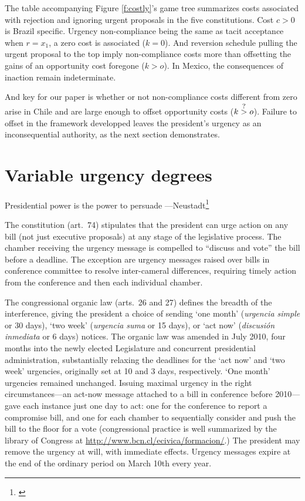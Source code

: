 \documentclass[letter,12pt]{article}
\begin{document}
The table accompanying Figure \ref{f:costly}'s game tree summarizes costs associated with rejection and ignoring urgent proposals in the five constitutions. Cost $c>0$ is Brazil specific. Urgency non-compliance being the same as tacit acceptance when $r=x_1$, a zero cost is associated ($k=0$). And reversion schedule pulling the urgent proposal to the top imply non-compliance costs more than offsetting the gains of an opportunity cost foregone ($k>o$). In Mexico, the consequences of inaction remain indeterminate. 

\newcommand\mygt{\mathrel{\stackrel{\makebox[0pt]{\mbox{\normalfont\footnotesize ?}}}{>}}} %

And key for our paper is whether or not non-compliance costs different from zero arise in Chile and are large enough to offset opportunity costs ($k \mygt o$). Failure to offset in the framework developped leaves the president's urgency as an inconsequential authority, as the next section demonstrates. %

\section{Variable urgency degrees}
\begin{center}
Presidential power is the power to persuade ---Neustadt\footnote{\citet[][11]{neustadt.1990}}
\end{center}

The constitution (art.\ 74) stipulates that the president can urge action on any bill (not just executive proposals) at any stage of the legislative process. The chamber receiving the urgency message is compelled to ``discuss and vote'' the bill before a deadline. The exception are urgency messages raised over bills in conference committee to resolve inter-cameral differences, requiring timely action from the conference and then each individual chamber.

The congressional organic law (arts.\ 26 and 27) defines the breadth of the interference, giving the president a choice of sending `one month' (\emph{urgencia simple} or 30 days), `two week' (\emph{urgencia suma} or 15 days), or `act now' (\emph{discusión inmediata} or 6 days) notices. The organic law was amended in July 2010, four months into the newly elected Legislature and concurrent presidential administration, substantially relaxing the deadlines for the `act now' and `two week' urgencies, originally set at 10 and 3 days, respectively. `One month' urgencies remained unchanged. Issuing maximal urgency in the right circumstances---an act-now message attached to a bill in conference before 2010---gave each instance just one day to act: one for the conference to report a compromise bill, and one for each chamber to sequentially consider and push the bill to the floor for a vote (congressional practice is well summarized by the library of Congress at \url{http://www.bcn.cl/ecivica/formacion/}.) The president may remove the urgency at will, with immediate effects. Urgency messages expire at the end of the ordinary period on March 10th every year. 
\end{document}
